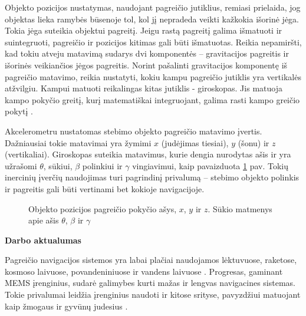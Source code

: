 

Objekto pozicijos nustatymas, naudojant pagreičio jutiklius, remiasi prielaida, jog objektas lieka ramybės būsenoje tol, kol jį nepradeda veikti kažkokia išorinė jėga. 
Tokia jėga suteikia objektui pagreitį. 
Jeigu rastą pagreitį galima išmatuoti ir suintegruoti, pagreičio ir pozicijos kitimas gali būti išmatuotas. 
Reikia nepamiršti, kad tokiu atveju matavimą sudarys dvi komponentės -- gravitacijos pagreitis ir išorinės veikiančios jėgos pagreitis. 
Norint pašalinti gravitacijos komponentę iš pagreičio matavimo, reikia nustatyti, kokiu kampu pagreičio jutiklis yra vertikalės atžvilgiu.
Kampui matuoti reikalingas kitas jutiklis - giroskopas.
Jis matuoja kampo pokyčio greitį, kurį matematiškai integruojant, galima rasti kampo greičio pokytį \cite{sukkarieh2000low}.

Akcelerometru nustatomas stebimo objekto pagreičio matavimo įvertis.
Dažniausiai tokie matavimai yra žymimi $x$ (judėjimas tiesiai), $y$ (šonu) ir $z$ (vertikaliai). 
Giroskopas suteikia matavimus, kurie dengia nurodytas ašis ir yra užrašomi $\theta$, sūkiui, $\beta$ polinkiui ir $\gamma$ vingiavimui, kaip pavaizduota \ref{tikz:axis_of_the_system} pav. 
Tokių inercinių įverčių naudojimas turi pagrindinį privalumą -- stebimo objekto polinkis ir pagreitis gali būti vertinami bet kokioje navigacijoje.  

\begin{figure}[b]
    \centering
    \caption{Objekto pozicijos pagreičio pokyčio ašys, $x$, $y$ ir $z$. Sūkio matmenys apie ašis $\theta$, $\beta$ ir $\gamma$}
    \label{tikz:axis_of_the_system}
\end{figure}

\textbf{Darbo aktualumas}

Pagreičio navigacijos sistemos yra labai plačiai naudojamos lėktuvuose, raketose, kosmoso laivuose, povandeniniuose ir vandens laivuose \cite{woodman2007introduction}.
Progresas, gaminant MEMS įrenginius, sudarė galimybes kurti mažas ir lengvas navigacines sistemas.
Tokie privalumai leidžia įrenginius naudoti ir kitose srityse, pavyzdžiui matuojant kaip žmogaus ir gyvūnų judesius \cite{schlomer2008gesture,suvorova2012action}.

